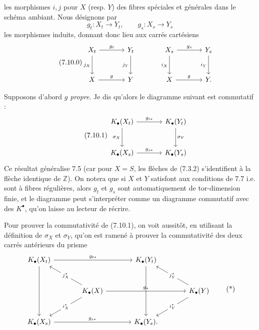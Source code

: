 
les morphismes \(i,j\) pour \(X\) (resp. \(Y\)) des fibres spéciales et générales dans le schéma ambiant. Nous désignons par
\[
  g_t:X_t\to Y_t,\qquad g_s:X_s\to Y_s
\]
les morphismes induits, donnant donc lieu aux carrés cartésiens
\begin{equation}\tag{7.10.0}
\begin{tikzcd}[column sep=large,row sep=large]
X_t \arrow[r,"g_t"] \arrow[d,"j_X"'] & Y_t \arrow[d,"j_Y"'] &
X_s \arrow[r,"g_s"] \arrow[d,"i_X"'] & Y_s \arrow[d,"i_Y"']\\
X \arrow[r,"g"] & Y &
X \arrow[r,"g"] & Y .
\end{tikzcd}
\end{equation}

Supposons d'abord \(g\) \emph{propre}. Je dis qu'alors le diagramme suivant est commutatif :
\begin{equation}\tag{7.10.1}
\begin{tikzcd}[column sep=large,row sep=large]
K_\bullet(X_t) \arrow[r,"g_{t*}"] \arrow[d,"\sigma_X"'] &
K_\bullet(Y_t) \arrow[d,"\sigma_Y"]\\
K_\bullet(X_s) \arrow[r,"g_{s*}"] &
K_\bullet(Y_s)
\end{tikzcd}
\end{equation}
Ce résultat généralise 7.5 (car pour \(X=S\), les flèches de (7.3.2) s'identifient à la flèche identique de \(\mathbb Z\)). On notera que si \(X\) et \(Y\) satisfont aux conditions de 7.7 i.e. sont à fibres régulières, alors \(g_t\) et \(g_s\) sont automatiquement de tor-dimension finie, et le diagramme peut s'interpréter comme un diagramme commutatif avec des \(K^\bullet\), qu'on laisse au lecteur de récrire.

Pour prouver la commutativité de (7.10.1), on voit aussitôt, en utilisant la définition de \(\sigma_X\) et \(\sigma_Y\), qu'on est ramené à prouver la commutativité des deux carrés antérieurs du prisme
\[
\begin{tikzcd}[column sep=large,row sep=large]
K_\bullet(X_t) \arrow[rr,"g_{t*}"] \arrow[dd] && K_\bullet(Y_t) \arrow[dd]\\
& K_\bullet(X) \arrow[ul,"j_X^*" description] \arrow[dl,"i_X^*" description] \arrow[rr,"g_*"] &&
K_\bullet(Y) \arrow[ul,"j_Y^*" description] \arrow[dl,"i_Y^*" description]\\
K_\bullet(X_s) \arrow[rr,"g_{s*}"] && K_\bullet(Y_s).
\end{tikzcd}
\tag{*}
\]
